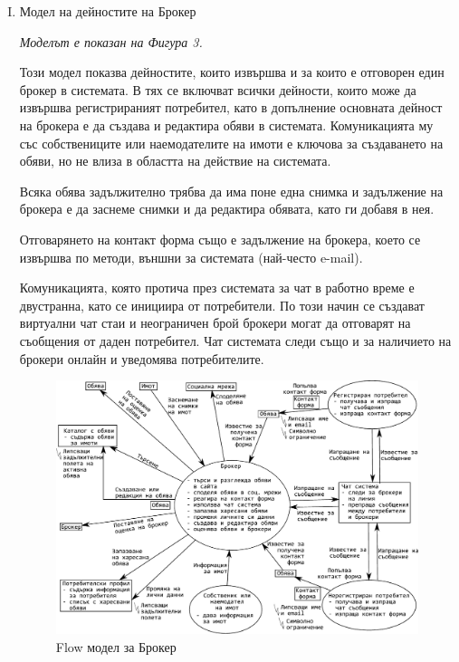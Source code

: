 \documentclass[]{article}
\begin{document}
\begin{enumerate}[I.]
{	} %
	
	\item {Модел на дейностите на Брокер

\emph{Моделът е показан на Фигура 3.} 

Този модел показва дейностите, които извършва и за които е отговорен един брокер в системата. В тях се включват всички дейности, които може да извършва регистрираният потребител, като в допълнение основната дейност на брокера е да създава и редактира обяви в системата. Комуникацията му със собствениците или наемодателите на имоти е ключова за създаването на обяви, но не влиза в областта на действие на системата.
 
Всяка обява задължително трябва да има поне една снимка и задължение на брокера е да заснеме снимки и да редактира обявата, като ги добавя в нея.

Отговарянето на контакт форма също е задължение на брокера, което се извършва по методи, външни за системата (най-често e-mail). 

Комуникацията, която протича през системата за чат в работно време е двустранна, като се инициира от потребители. По този начин се създават виртуални чат стаи и неограничен брой брокери могат да отговарят на съобщения от даден потребител. Чат системата следи също и за наличието на брокери онлайн и уведомява потребителите. 

	\begin{figure}[h]
	\centering
	\includegraphics[scale=0.85]{flow-broker}
	\caption{Flow модел за Брокер}
	\end{figure}
	
	} %


\end{enumerate}
\end{document}

